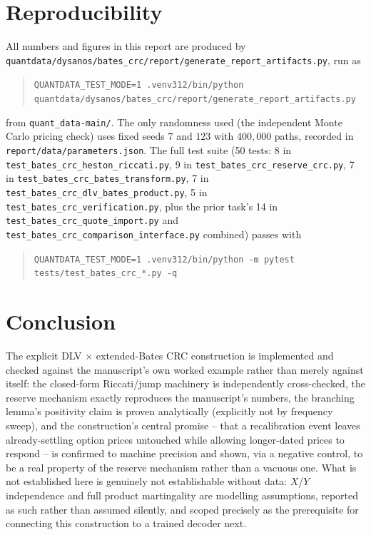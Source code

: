 \documentclass[11pt]{article}
\begin{document}
\section{Reproducibility}
\label{sec:repro}

All numbers and figures in this report are produced by
\texttt{quantdata/dysanos/bates\_crc/report/generate\_report\_artifacts.py},
run as
\begin{quote}
\texttt{QUANTDATA\_TEST\_MODE=1 .venv312/bin/python quantdata/dysanos/bates\_crc/report/generate\_report\_artifacts.py}
\end{quote}
from \texttt{quant\_data-main/}. The only randomness used (the independent
Monte Carlo pricing check) uses fixed seeds $7$ and $123$ with
$400{,}000$ paths, recorded in \texttt{report/data/parameters.json}. The
full test suite (50 tests: 8 in \texttt{test\_bates\_crc\_heston\_riccati.py},
9 in \texttt{test\_bates\_crc\_reserve\_crc.py}, 7 in
\texttt{test\_bates\_crc\_bates\_transform.py}, 7 in
\texttt{test\_bates\_crc\_dlv\_bates\_product.py}, 5 in
\texttt{test\_bates\_crc\_verification.py}, plus the prior task's 14 in
\texttt{test\_bates\_crc\_quote\_import.py} and
\texttt{test\_bates\_crc\_comparison\_interface.py} combined) passes with
\begin{quote}
\texttt{QUANTDATA\_TEST\_MODE=1 .venv312/bin/python -m pytest tests/test\_bates\_crc\_*.py -q}
\end{quote}

\section{Conclusion}
\label{sec:conclusion}

The explicit DLV $\times$ extended-Bates CRC construction is implemented
and checked against the manuscript's own worked example rather than merely
against itself: the closed-form Riccati/jump machinery is independently
cross-checked, the reserve mechanism exactly reproduces the manuscript's
numbers, the branching lemma's positivity claim is proven analytically
(explicitly not by frequency sweep), and the construction's central
promise -- that a recalibration event leaves already-settling option prices
untouched while allowing longer-dated prices to respond -- is confirmed to
machine precision and shown, via a negative control, to be a real property
of the reserve mechanism rather than a vacuous one. What is not established
here is genuinely not establishable without data: $X$/$Y$ independence and
full product martingality are modelling assumptions, reported as such
rather than assumed silently, and scoped precisely as the prerequisite for
connecting this construction to a trained decoder next.
\end{document}
